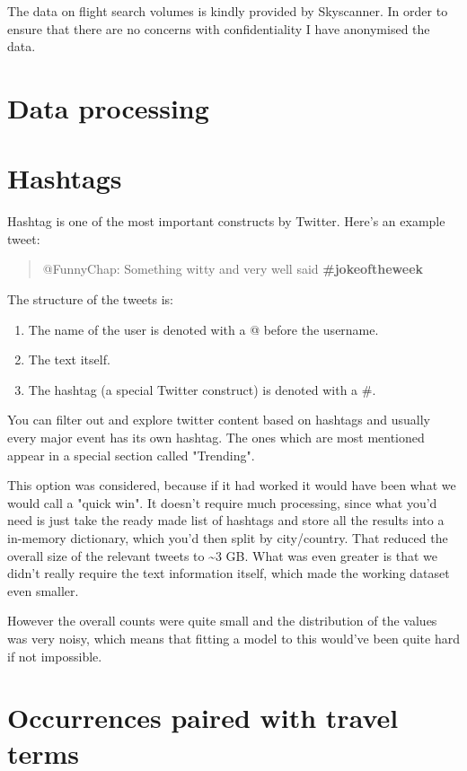 \documentclass[minf,frontabs,twoside,singlespacing,parskip]{infthesis}
\begin{document}
The data on flight search volumes is kindly provided by Skyscanner. In order to ensure that there are no concerns with confidentiality I have anonymised the data. 

\section{Data processing}
\label{sec:dp}

\section{Hashtags}
\label{sec:hashtag}

Hashtag is one of the most important constructs by Twitter. Here's an example tweet:

\begin{quotation}
@FunnyChap: Something witty and very well said \bf{\#jokeoftheweek}
\end{quotation}

The structure of the tweets is:
\begin{enumerate}
\item The name of the user is denoted with a @ before the username.
\item The text itself.
\item The hashtag (a special Twitter construct) is denoted with a \#.
\end{enumerate}

You can filter out and explore twitter content based on hashtags and usually every major event has its own hashtag. The ones which are most mentioned appear in a special section called "Trending".

This option was considered, because if it had worked it would have been what we would call a "quick win". It doesn't require much processing, since what you'd need is just take the ready made list of hashtags and store all the results into a in-memory dictionary, which you'd then split by city/country. That reduced the overall size of the relevant tweets to \textasciitilde 3 GB. What was even greater is that we didn't really require the text information itself, which made the working dataset even smaller. 

However the overall counts were quite small and the distribution of the values was very noisy, which means that fitting a model to this would've been quite hard if not impossible.

\section{Occurrences paired with travel terms} 
\label{sec:tweettext}
\end{document}
